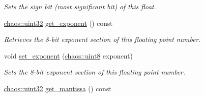 \begin{DoxyCompactItemize}
\begin{DoxyCompactList}\small\item\em Sets the sign bit (most significant bit) of this float. \end{DoxyCompactList}\item 
\hypertarget{unionchaos_1_1data_1_1_bitwise_float_a18da7f215f0f901943f24556cd9f1f4e}{\hyperlink{namespacechaos_a8641b3ae4551f0b35570d4f9f4ec22d9}{chaos\-::uint32} \hyperlink{unionchaos_1_1data_1_1_bitwise_float_a18da7f215f0f901943f24556cd9f1f4e}{get\-\_\-exponent} () const }\label{unionchaos_1_1data_1_1_bitwise_float_a18da7f215f0f901943f24556cd9f1f4e}

\begin{DoxyCompactList}\small\item\em Retrieves the 8-\/bit exponent section of this floating point number. \end{DoxyCompactList}\item 
\hypertarget{unionchaos_1_1data_1_1_bitwise_float_af3558e3752a224efb2b5e1b7df0ff473}{void \hyperlink{unionchaos_1_1data_1_1_bitwise_float_af3558e3752a224efb2b5e1b7df0ff473}{set\-\_\-exponent} (\hyperlink{namespacechaos_acbc0796d6929e3182cfd4f5c0176ab51}{chaos\-::uint8} exponent)}\label{unionchaos_1_1data_1_1_bitwise_float_af3558e3752a224efb2b5e1b7df0ff473}

\begin{DoxyCompactList}\small\item\em Sets the 8-\/bit exponent section of this floating point number. \end{DoxyCompactList}\item 
\hypertarget{unionchaos_1_1data_1_1_bitwise_float_afe4e313f09b01b6492a0dffce0d47b0b}{\hyperlink{namespacechaos_a8641b3ae4551f0b35570d4f9f4ec22d9}{chaos\-::uint32} \hyperlink{unionchaos_1_1data_1_1_bitwise_float_afe4e313f09b01b6492a0dffce0d47b0b}{get\-\_\-mantissa} () const }\label{unionchaos_1_1data_1_1_bitwise_float_afe4e313f09b01b6492a0dffce0d47b0b}


\end{DoxyCompactItemize}
